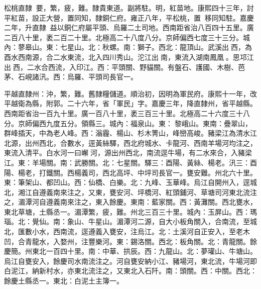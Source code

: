 \begin{pinyinscope}
松桃直隸：要，繁，疲，難。隸貴東道。副將駐。明，紅苗地。康熙四十三年，討平紅苗，設正大營，置同知，隸銅仁府。雍正八年，平松桃，置，移同知駐。嘉慶二年，升直隸，益以銅仁府屬平頭、烏羅二土司地。西南距省治八百四十五里。廣二百八十里，袤二百二十里。北極高二十八度八分。京師偏西七度三十三分。城內：蓼皋山。東：七星山。北：秋螺。南：獅子。西北：龍頂山。武溪出西，為酉水西南源，合二水東流，北入四川秀山。沱江出南，東流入湖南鳳凰。思邛江出西，二水合西流，入印江。西：平頭關、野貓關。有盤石、護國、木樹、芭茅、石峴諸汛。西：烏羅、平頭司長官一。

平越直隸州：沖，繁，難。舊隸糧儲道。順治初，因明為軍民府。康熙十一年，改平越衛為縣，附郭。二十六年，省「軍民」字。嘉慶三年，降直隸州，省平越縣。西南距省治一百九十里。廣一百八十里，袤三百三十里。北極高二十六度三十八分。京師偏西九度五分。領縣三。城內：福泉山。東：黎峨山。東南：疊翠山，群峰插天，中為老人峰。西：滃霾、楊山、杉木箐山，峰巒高峻。豬梁江為清水江北源，出州西北，合數水，逕黃絲驛，西北府城水、卡龍河、西南羊場河均注之，東流入清平。白水河一曰嶰河，源出州西北，南流逕牛場，有二水來合，入豬梁江。東：羊場關。南：武勝關。北：七星關。驛三：酉陽、黃絲、楊老。汛三：酉陽、楊老，打鐵關。西楊義司，西北高坪、中坪司長官一。甕安難。州北六十里。東：筆架山、都凹山。西：仙橋、白樂。北：九峰、玉華峰。烏江自開州入，逕城北，湘江自遵義南來注之，又東，甕安河、坪橋河、紅頭鋪河、草塘司河東北流注之，湄潭河自遵義南來注之，東入餘慶。東南：藍家關。西：黃灘關。西北甕水，東北草塘，土縣丞一。湄潭繁，疲，難。州北三百三十里。城內：玉屏山。西：瑪瑙。北：覺仙。南：象山、牛星山。湄潭河二源，自大小板角關入，合南流，至城北，匯數小水，西南流，逕遵義入甕安，注烏江。北：土溪河自正安入，至老木凹，合青龍水，入婺州，注豐樂河。東：錫洛關。西北：板角關。北：青龍關。餘慶簡。州東北一百四十里。南：中華、拱辰。西：九龍山。北：夢瓘山、牛塘山。烏江自甕安入，餘慶司水南流注之。河自甕安納小江、豬場河，東北流，牛場河即白泥江，納新村水，亦東北流注之，又東北入石阡。南：頭關。西：中關。西北：餘慶土縣丞一。東北：白泥土主簿一。


\end{pinyinscope}